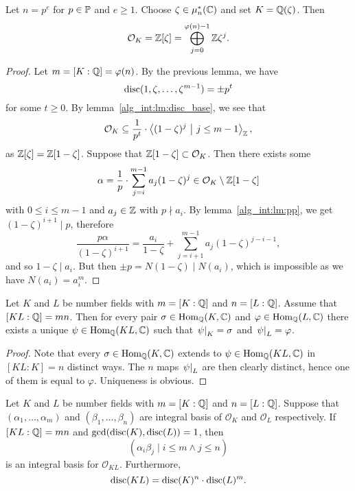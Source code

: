 \begin{izrek}
\label{alg_int:thm:pp_basis}
Let $n = p^e$ for $p \in \P$ and $e \geq 1$. Choose
$\zeta \in \mu_n^*(\C)$ and set $K = \Q(\zeta)$. Then
\[
\mathcal{O}_K =
\Z[\zeta] =
\bigoplus_{j=0}^{\varphi(n)-1} \Z \zeta^j.
\]
\end{izrek}

\begin{proof}
Let $m = [K : \Q] = \varphi(n)$. By the previous lemma, we have
\[
\disc(1, \zeta, \dots, \zeta^{m-1}) = \pm p^t
\]
for some $t \geq 0$. By lemma~\ref{alg_int:lm:disc_base}, we see
that
\[
\mathcal{O}_K \subseteq
\frac{1}{p^t} \cdot \skl{(1-\zeta)^j~\middle\vert~j \leq m-1}_\Z,
\]
as $\Z[\zeta] = \Z[1-\zeta]$. Suppose that
$\Z[1-\zeta] \subset \mathcal{O}_K$. Then there exists some
\[
\alpha =
\frac{1}{p} \cdot \sum_{j=i}^{m-1} a_j (1-\zeta)^j \in
\mathcal{O}_K \setminus \Z[1-\zeta]
\]
with $0 \leq i \leq m-1$ and $a_j \in \Z$ with $p \nmid a_i$. By
lemma~\ref{alg_int:lm:pp}, we get $(1-\zeta)^{i+1} \mid p$,
therefore
\[
\frac{p \alpha}{(1-\zeta)^{i+1}} =
\frac{a_i}{1-\zeta} + \sum_{j=i+1}^{m-1} a_j (1-\zeta)^{j-i-1},
\]
and so $1-\zeta \mid a_i$. But then
$\pm p = N(1-\zeta) \mid N(a_i)$, which is impossible as we have
$N(a_i) = a_i^m$.
\end{proof}

\begin{lema}
Let $K$ and $L$ be number fields with $m = [K : \Q]$ and
$n = [L : \Q]$. Assume that $[KL : \Q] = mn$. Then for every pair
$\sigma \in \Hom_\Q(K, \C)$ and $\varphi \in \Hom_\Q(L, \C)$ there
exists a unique $\psi \in \Hom_\Q(KL, \C)$ such that
$\eval{\psi}{K}{} = \sigma$ and $\eval{\psi}{L}{} = \varphi$.
\end{lema}

\begin{proof}
Note that every $\sigma \in \Hom_\Q(K, \C)$ extends to
$\psi \in \Hom_\Q(KL, \C)$ in $[KL : K] = n$ distinct ways. The $n$
maps $\eval{\psi}{L}{}$ are then clearly distinct, hence one of
them is equal to $\varphi$. Uniqueness is obvious.
\end{proof}

\begin{izrek}
Let $K$ and $L$ be number fields with $m = [K : \Q]$ and
$n = [L : \Q]$. Suppose that $(\alpha_1, \dots, \alpha_m)$ and
$(\beta_1, \dots, \beta_n)$ are integral basis of $\mathcal{O}_K$
and $\mathcal{O}_L$ respectively. If $[KL : \Q] = mn$ and
$\gcd(\disc(K), \disc(L)) = 1$, then
\[
(\alpha_i \beta_j \mid i \leq m \land j \leq n)
\]
is an integral basis for $\mathcal{O}_{KL}$. Furthermore,
\[
\disc(KL) = \disc(K)^n \cdot \disc(L)^m.
\]
\end{izrek}

